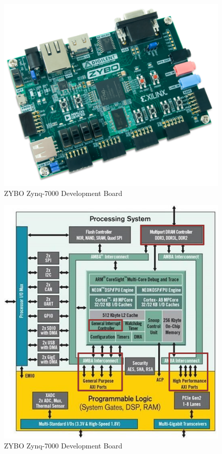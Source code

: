 


\begin{figure} [!h]
	\centering
	\includegraphics[scale = 0.6]{Figures/zynq7000} 
	\caption[ZYBO Zynq-7000 Development Board]{ZYBO Zynq-7000 Development Board}
	\label{img_ZYBO}
\end{figure}


\begin{figure} [!h]
	\centering
	\includegraphics[scale = 0.5]{Figures/zynqComponents} 
	\caption[ZYBO Zynq-7000 Development Board]{ZYBO Zynq-7000 Development Board}
	\label{img_ZYBO}
\end{figure}

